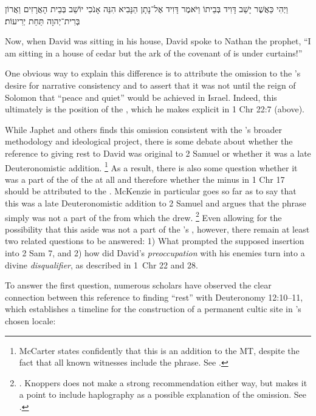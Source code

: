 \begin{hebrewtext}
    וַיְהִי כַּאֲשֶׁר יָשַׁב דָּוִיד בְּבֵיתוֹ וַיֹּאמֶר דָּוִיד אֶל־נָתָן הַנָּבִיא הִנֵּה אָנֹכִי יוֹשֵׁב בְּבֵית הָאֲרָזִים וַאֲרוֹן בְּרִית־יְהוָה תַּחַת יְרִיעוֹת׃
\end{hebrewtext}
\begin{translation}
    Now, when David was sitting in his house, David spoke to Nathan the prophet, ``I am sitting in a house of cedar but the ark of the covenant of \yahweh is under curtains!'' 
\end{translation}
\noindent
One obvious way to explain this difference is to attribute the omission to the \chronicler's desire for narrative consistency and to assert that it was not until the reign of Solomon that ``peace and quiet'' would be achieved in Israel. Indeed, this ultimately is the position of the \chronicler, which he makes explicit in 1 Chr 22:7 (above). 

While Japhet and others finds this omission consistent with the \chronicler's broader methodology and ideological project,%
    \autocite[328]{japhet1993}
there is some debate about whether the reference to \yahweh giving rest to David was original to 2 Samuel or whether it was a late Deuteronomistic addition.%
    \footnote{McCarter states confidently that this is an addition to the MT, despite the fact that all known witnesses include the phrase. See \cite[191]{mccarter1984}.}
As a result, there is also some question whether it was a part of the \vorlage of the \chronicler at all and therefore whether the minus in 1 Chr 17 should be attributed to the \chronicler. McKenzie in particular goes so far as to say that this was a late Deuteronomistic addition to 2 Samuel and argues that the phrase simply was not a part of the \vorlage from which the \chronicler drew.%
    \footnote{\cite[63]{mckenzie1985}. Knoppers does not make a strong recommendation either way, but makes it a point to include haplography as a possible explanation of the omission. See \cite[666]{knoppers2007}.}
Even allowing for the possibility that this aside was not a part of the \chronicler's \vorlage, however, there remain at least two related questions to be answered: 1) What prompted the supposed insertion into 2 Sam 7, and 2) how did David's \emph{preoccupation} with his enemies turn into a divine \emph{disqualifier}, as described in 1~Chr 22 and 28.

To answer the first question, numerous scholars have observed the clear connection between this reference to finding ``rest'' with Deuteronomy 12:10--11, which establishes a timeline for the construction of a permanent cultic site in \yahweh's chosen locale:

